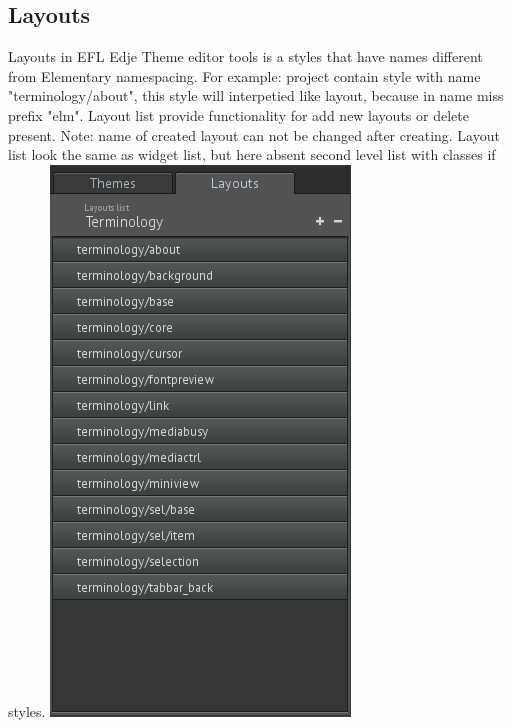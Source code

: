\documentclass[titlepage,oneside,11pt]{book}
\begin{document}
\subsection{Layouts}
Layouts in EFL Edje Theme editor tools is a styles that have names different from Elementary namespacing. For example: project contain style with name "{}terminology/about"{}, this style will interpetied like layout, because in name miss prefix "{}elm"{}.\newline
Layout list provide functionality for add new layouts or delete present. Note: name of created layout can not be changed after creating.\newline
Layout list look the same as widget list, but here absent second level list with classes if styles.\newline
\includegraphics[scale=0.5]{images/layout_list.png}\newline
\end{document}
